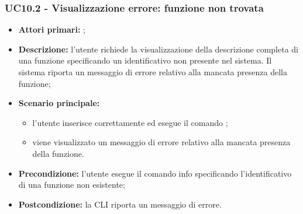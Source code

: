\subsubsection{UC10.2 - Visualizzazione errore: funzione non trovata}
\begin{itemize}
	\item \textbf{Attori primari:} \ua{};
	\item \textbf{Descrizione:} l’utente richiede la visualizzazione della descrizione completa di una funzione specificando un identificativo non presente nel sistema. Il sistema riporta un messaggio di errore relativo alla mancata presenza della funzione; 
	\item \textbf{Scenario principale:} 
	\begin{itemize}
		\item l'utente inserisce correttamente ed esegue il comando \pinfo{}; 
		\item viene visualizzato un messaggio di errore relativo alla mancata presenza della funzione. 
	\end{itemize}
	\item \textbf{Precondizione:} l’utente esegue il comando info specificando l’identificativo di una funzione non esistente; 
	\item \textbf{Postcondizione:} la CLI riporta un messaggio di errore.
\end{itemize}